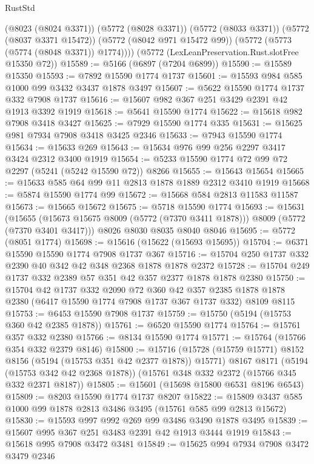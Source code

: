 \begin{lexlean}{RustStd}
\begin{coremodule}
        (@8023 (@8024 @3371))
        (@5772 (@8028 @3371))
        (@5772 (@8033 @3371))
        (@5772 (@8037 @3371 @15472))
        (@5772 (@8042 @971 @15472 @99))
        (@5772 (@5773 (@5774 (@8048 @3371)) @1774))))
    (@5772 (LexLeanPreservation.Rust.slotFree @15350 @72))
@15589 := @5166 (@6897 (@7204 @6899))
@15590 := @15589 @15350
@15593 := @7892 @15590 @1774 @1737
@15601 := @15593 @984 @585 @1000 @99 @3432 @3437 @1878 @3497
@15607 := @5622 @15590 @1774 @1737 @332 @7908 @1737
@15616 := @15607 @982 @367 @251 @3429 @2391 @42 @1913 @3392 @1919
@15618 := @5641 @15590 @1774
@15622 := @15618 @982 @7908 @3418 @3427
@15625 := @7929 @15590 @1774 @335
@15631 := @15625 @981 @7934 @7908 @3418 @3425 @2346
@15633 := @7943 @15590 @1774
@15634 := @15633 @269
@15643 := @15634 @976 @99 @256 @2297 @3417 @3424 @2312 @3400 @1919
@15654 := @5233 @15590 @1774 @72 @99 @72 @2297 (@5241 (@5242 @15590 @72)) @8266
@15655 := @15643 @15654
@15665 := @15633 @585 @64 @99 @11 @2813 @1878 @1889 @2312 @3410 @1919
@15668 := @5874 @15590 @1774 @99
@15672 := @15668 @584 @2813 @11583 @11587
@15673 := @15665 @15672
@15675 := @5718 @15590 @1774
@15693 := @15631
    (@15655 (@15673 @15675 @8009 (@5772 (@7370 @3411 @1878))) @8009 (@5772 (@7370 @3401 @3417)))
    @8026
    @8030
    @8035
    @8040
    @8046
@15695 := @5772 (@8051 @1774)
@15698 := @15616 (@15622 (@15693 @15695))
@15704 := @6371 @15590 @15590 @1774 @7908 @1737 @367
@15716 := @15704 @250 @1737 @332 @2390 @40 @342 @42 @348 @2368 @1878 @1878 @2372
@15728 := @15704 @249 @1737 @332 @2389 @57 @351 @42 @357 @2377 @1878 @1878 @2380
@15750 := @15704
    @42
    @1737
    @332
    @2090
    @72
    @360
    @42
    @357
    @2385
    @1878
    @1878
    @2380
    (@6417 @15590 @1774 @7908 @1737 @367 @1737 @332)
    @8109
    @8115
@15753 := @6453 @15590 @7908 @1737
@15759 := @15750 (@5194 (@15753 @360 @42 @2385 @1878))
@15761 := @6520 @15590 @1774
@15764 := @15761 @357 @332 @2380
@15766 := @8134 @15590 @1774
@15771 := @15764 (@15766 @354 @332 @2379 @8146)
@15800 := @15716
    (@15728 (@15759 @15771) @8152 @8156 (@5194 (@15753 @351 @42 @2377 @1878)) @15771)
    @8167
    @8171
    (@5194 (@15753 @342 @42 @2368 @1878))
    (@15761 @348 @332 @2372 (@15766 @345 @332 @2371 @8187))
@15805 := @15601 (@15698 @15800 @6531 @8196 @6543)
@15809 := @8203 @15590 @1774 @1737 @8207
@15822 := @15809 @3437 @585 @1000 @99 @1878 @2813 @3486 @3495 (@15761 @585 @99 @2813 @15672)
@15830 := @15593 @997 @992 @269 @99 @3486 @3490 @1878 @3495
@15839 := @15607 @995 @367 @251 @3483 @2391 @42 @1913 @3444 @1919
@15843 := @15618 @995 @7908 @3472 @3481
@15849 := @15625 @994 @7934 @7908 @3472 @3479 @2346

\end{coremodule}
\end{lexlean}
